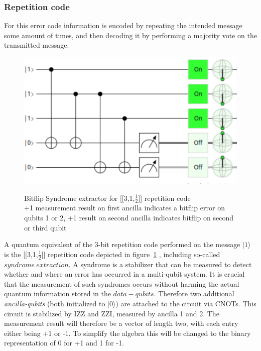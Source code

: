 \subsubsection{Repetition code}
For this error code information is encoded by repeating the 
intended message some amount of times, and then decoding it
by performing a majority vote on the transmitted message.


\begin{figure}[h!]
	\begin{center}
	\captionsetup{justification=centering,margin=2cm}
	\includegraphics[scale=0.2]{./img/figures/bitflipSyndromeExtraction3Rep.png}\\
	\caption{Bitflip Syndrome extractor for [[3,1,$\frac{1}{2}$]] repetition code\\
        +1 measurement result on first ancilla indicates a bitflip error
        on qubits 1 or 2, +1 result on second ancilla indicates 
		bitflip on second or third qubit}
	\label{fig: syndrome extractor}
	\end{center}
\end{figure}

A quantum equivalent of the 3-bit repetition code performed on
the message $|1\rangle$ is the [[3,1,$\frac{1}{2}$]] repetition
code depicted in 
figure~\ref{fig: syndrome extractor}
, including so-called
$syndrome\ extraction$. A syndrome is a stabilizer that can be
measured to detect whether and where an error has occurred
in a multi-qubit system. It is crucial that the 
measurement of such syndromes occurs without harming the actual
quantum information stored in the $data-qubits$. Therefore
two additional \emph{ancilla-qubits} (both initialized to 
$|0\rangle$) are attached to the circuit via CNOTs.
This circuit is stabilized by IZZ and ZZI, measured by ancilla 
1 and 2. The measurement result will therefore be a vector of length
two, with each entry either being +1 or -1. To simplify the 
algebra this will be changed to the binary representation of 0 
for +1 and 1 for -1. 

